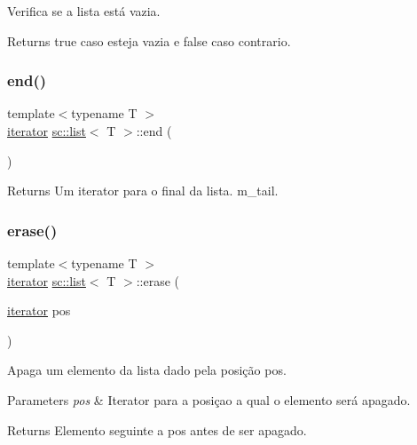 Verifica se a lista está vazia. \begin{DoxyReturn}{Returns}
true caso esteja vazia e false caso contrario. 
\end{DoxyReturn}
\mbox{\label{classsc_1_1list_a48429f0cf3d990fa6dfd5140e6aa95a7}} 
\subsubsection{\texorpdfstring{end()}{end()}}
{\footnotesize\ttfamily template$<$typename T $>$ \\
\hyperlink{classsc_1_1list_1_1iterator}{iterator} \hyperlink{classsc_1_1list}{sc\+::list}$<$ T $>$\+::end (\begin{DoxyParamCaption}{ }\end{DoxyParamCaption})\hspace{0.3cm}{\ttfamily [inline]}}

\begin{DoxyReturn}{Returns}
Um iterator para o final da lista. m\+\_\+tail. 
\end{DoxyReturn}
\mbox{\label{classsc_1_1list_a12a195a7ebaf3455f245caa852b44a9b}} 
\subsubsection{\texorpdfstring{erase()}{erase()}\hspace{0.1cm}{\footnotesize\ttfamily [1/4]}}
{\footnotesize\ttfamily template$<$typename T $>$ \\
\hyperlink{classsc_1_1list_1_1iterator}{iterator} \hyperlink{classsc_1_1list}{sc\+::list}$<$ T $>$\+::erase (\begin{DoxyParamCaption}\item[{\hyperlink{classsc_1_1list_1_1iterator}{iterator}}]{pos }\end{DoxyParamCaption})\hspace{0.3cm}{\ttfamily [inline]}}

Apaga um elemento da lista dado pela posição pos. 
\begin{DoxyParams}{Parameters}
{\em pos} & Iterator para a posiçao a qual o elemento será apagado. \\
\hline
\end{DoxyParams}
\begin{DoxyReturn}{Returns}
Elemento seguinte a pos antes de ser apagado. 
\end{DoxyReturn}
\mbox{\label{classsc_1_1list_ae796301c82f58d72d10ec7c30fb0b024}} 
